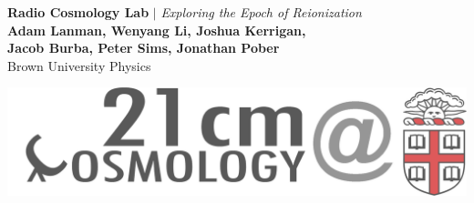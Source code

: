 \documentclass[a0,landscape]{a0poster}
\begin{document}


\begin{minipage}[b]{0.5\textwidth}
\veryHuge \color{Brown} \textbf{Radio Cosmology Lab} \color{Black}\textbf{$|$} \color{Black}\LARGE\textit{Exploring the Epoch of Reionization}\\
\textbf{Adam Lanman, Wenyang Li, Joshua Kerrigan,\\ Jacob Burba, Peter Sims, Jonathan Pober}\\ %
\huge Brown University Physics\\ %
\end{minipage}
\begin{minipage}[b]{0.6\linewidth}
\includegraphics[width=45cm]{radiologo_update.png} %
\end{minipage}

\end{document}
